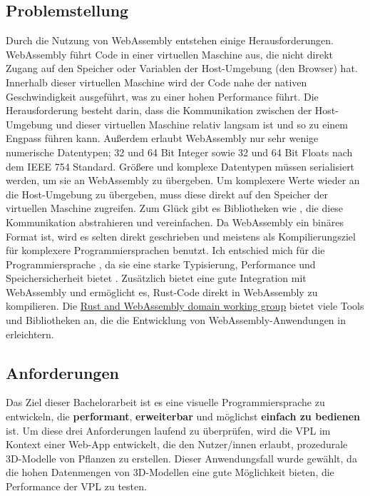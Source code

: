 \documentclass[ngerman]{article}
\begin{document}
\pagebreak

\subsection{Problemstellung}

Durch die Nutzung von WebAssembly entstehen einige Herausforderungen. 
WebAssembly führt Code in einer virtuellen Maschine aus, die nicht direkt Zugang auf den Speicher oder Variablen der Host-Umgebung (den Browser) hat.
Innerhalb dieser virtuellen Maschine wird der Code nahe der nativen Geschwindigkeit ausgeführt, was zu einer hohen Performance führt. 
Die Herausforderung besteht darin, dass die Kommunikation zwischen der Host-Umgebung und dieser virtuellen Maschine relativ langsam ist und so zu einem Engpass führen kann.
\br
Außerdem erlaubt WebAssembly nur sehr wenige numerische Datentypen; 32 und 64 Bit Integer sowie 32 und 64 Bit Floats nach dem IEEE 754 Standard. 
Größere und komplexe Datentypen müssen serialisiert werden, um sie an WebAssembly zu übergeben. 
Um komplexere Werte wieder an die Host-Umgebung zu übergeben, muss diese direkt auf den Speicher der virtuellen Maschine zugreifen.
Zum Glück gibt es Bibliotheken wie , die diese Kommunikation abstrahieren und vereinfachen.
\br
Da WebAssembly ein binäres Format ist, wird es selten direkt geschrieben und meistens als Kompilierungsziel für komplexere Programmiersprachen benutzt.
Ich entschied mich für die Programmiersprache , da sie eine starke Typisierung, Performance und Speichersicherheit bietet \cite{bugden2022rust}.
Zusätzlich bietet  eine gute Integration mit WebAssembly und ermöglicht es, Rust-Code direkt in WebAssembly zu kompilieren. 
Die \href{https://rustwasm.github.io/}{Rust and WebAssembly domain working group} bietet viele Tools und Bibliotheken an, die die Entwicklung von WebAssembly-Anwendungen in  erleichtern.

\subsection{Anforderungen} 
\label{sec:Anforderungen}

Das Ziel dieser Bachelorarbeit ist es eine visuelle Programmiersprache zu entwickeln, die \textbf{performant}, \textbf{erweiterbar} und möglichst \textbf{einfach zu bedienen} ist.
Um diese drei Anforderungen laufend zu überprüfen, wird die VPL im Kontext einer Web-App entwickelt, die den Nutzer/innen erlaubt, prozedurale 3D-Modelle von Pflanzen zu erstellen.
Dieser Anwendungsfall wurde gewählt, da die hohen Datenmengen von 3D-Modellen eine gute Möglichkeit bieten, die Performance der VPL zu testen.
\end{document}
